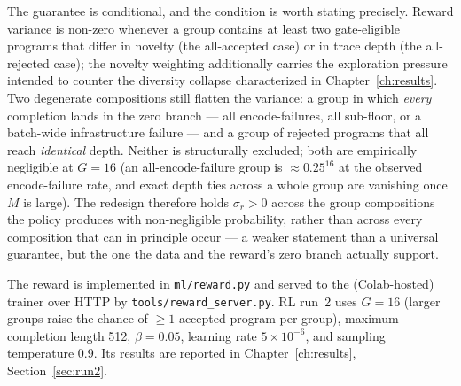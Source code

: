 The guarantee is conditional, and the condition is worth stating precisely. Reward
variance is non-zero whenever a group contains at least two gate-eligible programs
that differ in novelty (the all-accepted case) or in trace depth (the all-rejected
case); the novelty weighting additionally carries the exploration pressure intended
to counter the diversity collapse characterized in Chapter~\ref{ch:results}. Two
degenerate compositions still flatten the variance: a group in which \emph{every}
completion lands in the zero branch --- all encode-failures, all sub-floor, or a
batch-wide infrastructure failure --- and a group of rejected programs that all
reach \emph{identical} depth. Neither is structurally excluded; both are
empirically negligible at $G=16$ (an all-encode-failure group is
$\approx 0.25^{16}$ at the observed encode-failure rate, and exact depth ties across
a whole group are vanishing once $M$ is large). The redesign therefore holds
$\sigma_r > 0$ across the group compositions the policy produces with non-negligible
probability, rather than across every composition that can in principle occur --- a
weaker statement than a universal guarantee, but the one the data and the reward's
zero branch actually support.

The reward is implemented in \texttt{ml/reward.py} and served to the
(Colab-hosted) trainer over HTTP by \texttt{tools/reward\_server.py}. RL run~2 uses
$G=16$ (larger groups raise the chance of $\geq 1$ accepted program per group),
maximum completion length 512, $\beta = 0.05$, learning rate $5\times10^{-6}$, and
sampling temperature 0.9. Its results are reported in
Chapter~\ref{ch:results}, Section~\ref{sec:run2}.
